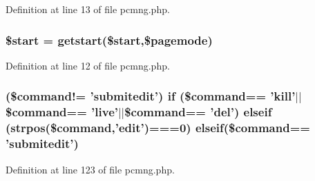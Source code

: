 Definition at line 13 of file pcmng.\+php.

\hypertarget{pcmng_8php_a50a00e7de77365e00b117e73aa82fb9b}{
\subsubsection[{\$start}]{\setlength{\rightskip}{0pt plus 5cm}\$start = {\bf getstart}(\$start,\$pagemode)}}\label{pcmng_8php_a50a00e7de77365e00b117e73aa82fb9b}


Definition at line 12 of file pcmng.\+php.

\hypertarget{pcmng_8php_aebac72f4767ff39b22abc0d8f2793660}{
\subsubsection[{elseif}]{ (\$command!= 'submitedit') {\bf if} (\$command== '{\bf kill}'$\vert$$\vert$\$command== 'live'$\vert$$\vert$\$command== 'del') elseif (strpos(\$command,'edit')===0) elseif(\$command== 'submitedit')}}\label{pcmng_8php_aebac72f4767ff39b22abc0d8f2793660}


Definition at line 123 of file pcmng.\+php.

